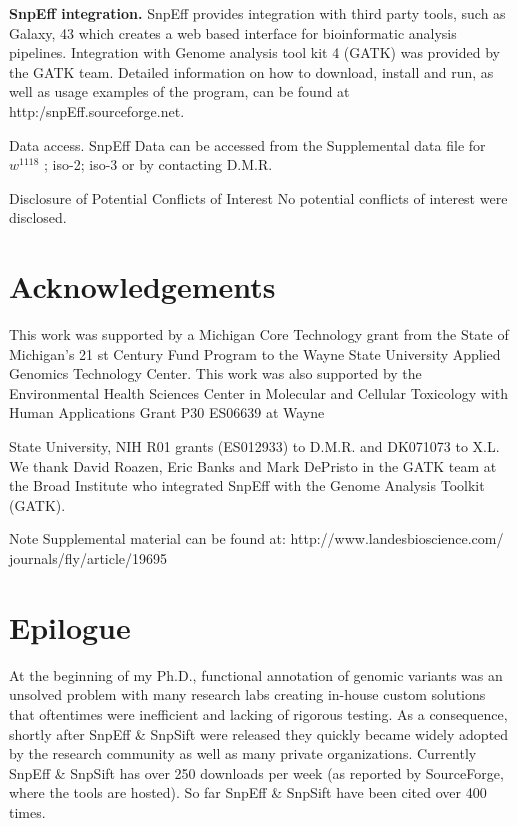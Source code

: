 \textbf{SnpEff integration.} SnpEff provides integration with third party tools, such as Galaxy, 43 which creates a web based interface for bioinformatic analysis pipelines.  Integration with Genome analysis tool kit 4 (GATK) was provided by the GATK team.  Detailed information on how to download, install and run, as well as usage examples of the program, can be found at http:/snpEff.sourceforge.net.  

Data access. SnpEff Data can be accessed from the Supplemental data file for $w^{1118}$ ; iso-2; iso-3 or by contacting D.M.R.

Disclosure of Potential Conflicts of Interest No potential conflicts of interest were disclosed.


\section{Acknowledgements}

This work was supported by a Michigan Core Technology grant from the State of Michigan’s 21 st Century Fund Program to the Wayne State University Applied Genomics Technology Center. This work was also supported by the Environmental Health Sciences Center in Molecular and Cellular Toxicology with Human Applications Grant P30 ES06639 at Wayne

State University, NIH R01 grants (ES012933) to D.M.R. and DK071073 to X.L. We thank David Roazen, Eric Banks and Mark DePristo in the GATK team at the Broad Institute who integrated SnpEff with the Genome Analysis Toolkit (GATK).

Note Supplemental material can be found at: http://www.landesbioscience.com/ journals/fly/article/19695

\section{Epilogue}

At the beginning of my Ph.D., functional annotation of genomic variants was an unsolved problem with many research labs creating in-house custom solutions that oftentimes were inefficient and lacking of rigorous testing. As a consequence, shortly after SnpEff \& SnpSift were released they quickly became widely adopted by the research community as well as many private organizations. Currently SnpEff \& SnpSift has over 250 downloads per week (as reported by  SourceForge, where the tools are hosted). So far SnpEff \& SnpSift  have been cited over 400 times.

